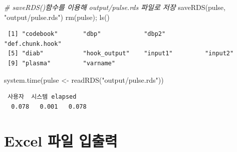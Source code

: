\documentclass[
  11pt,
]{krantz}
\newenvironment{Shaded}{\begin{snugshade}}{\end{snugshade}}
\newcommand{\CommentTok}[1]{\textcolor[rgb]{0.37,0.37,0.37}{\textit{#1}}}
\newcommand{\FunctionTok}[1]{\textcolor[rgb]{0,0,0}{#1}}
\newcommand{\NormalTok}[1]{#1}
\newcommand{\OtherTok}[1]{\textcolor[rgb]{0.37,0.37,0.37}{#1}}
\newcommand{\StringTok}[1]{\textcolor[rgb]{0.5,0.5,0.5}{#1}}
\begin{document}
\begin{Shaded}
\begin{Highlighting}[]
\CommentTok{\# saveRDS()함수를 이용해 output/pulse.rds 파일로 저장}
\FunctionTok{saveRDS}\NormalTok{(pulse, }\StringTok{"output/pulse.rds"}\NormalTok{)}
\FunctionTok{rm}\NormalTok{(pulse); }\FunctionTok{ls}\NormalTok{()}
\end{Highlighting}
\end{Shaded}

\begin{verbatim}
 [1] "codebook"       "dbp"            "dbp2"           "def.chunk.hook"
 [5] "diab"           "hook_output"    "input1"         "input2"        
 [9] "plasma"         "varname"       
\end{verbatim}

\begin{Shaded}
\begin{Highlighting}[]
\FunctionTok{system.time}\NormalTok{(pulse }\OtherTok{\textless{}{-}} \FunctionTok{readRDS}\NormalTok{(}\StringTok{"output/pulse.rds"}\NormalTok{))}
\end{Highlighting}
\end{Shaded}

\begin{verbatim}
 사용자  시스템 elapsed 
  0.078   0.001   0.078 
\end{verbatim}

\normalsize

\hypertarget{import-export-excel}{%
\section{Excel 파일 입출력}\label{import-export-excel}}
\end{document}
